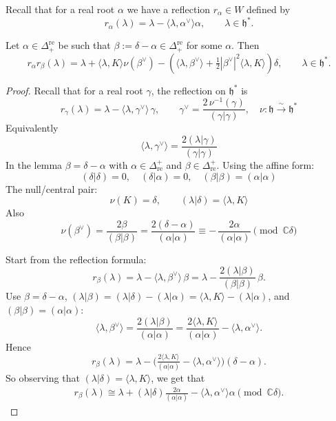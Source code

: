 \documentclass[12pt]{article}
\begin{document}
Recall that for a real root $\alpha$ we have a reflection $r_\alpha \in W$ defined by
\[
r_\alpha(\lambda) = \lambda - \langle \lambda, \alpha^\vee \rangle \alpha,
\qquad \lambda \in \mathfrak{h}^*.
\]

\begin{lemma}[6.5]
Let $\alpha \in \Delta^{\mathrm{re}}_+$ be such that $\beta := \delta - \alpha\in \Delta^{\mathrm{re}}_+$ 
for some $\alpha$. Then
\[
r_\alpha r_\beta(\lambda) 
= \lambda + \langle \lambda, K \rangle \nu(\beta^\vee) - (\langle \lambda, \beta^\vee\rangle 
+ \tfrac{1}{2}|\beta^\vee|^2 \langle \lambda, K \rangle)\delta,
\qquad \lambda \in \mathfrak{h}^*.
\]
\end{lemma}

\begin{proof}
    Recall that for a real root $\gamma$, the reflection on $\mathfrak{h}^*$ is
    \[
    r_\gamma(\lambda)=\lambda-\langle\lambda,\gamma^\vee\rangle\,\gamma,
    \qquad
    \gamma^\vee=\frac{2\,\nu^{-1}(\gamma)}{(\gamma|\gamma)},\quad
    \nu:\mathfrak{h}\overset{\sim}{\to}\mathfrak{h}^*
    \]
    Equivalently
    \[
    \langle\lambda,\gamma^\vee\rangle=\frac{2(\lambda|\gamma)}{(\gamma|\gamma)}
    \]
    In the lemma $\beta=\delta-\alpha$ with $\alpha\in\Delta_{\mathrm{re}}^+$ and $\beta\in\Delta_{\mathrm{re}}^+$.
    Using the affine form:
    \[
    (\delta|\delta)=0,\quad (\delta|\alpha)=0,\quad (\beta|\beta)=(\alpha|\alpha)
    \]
    The null/central pair:
    \[
    \nu(K)=\delta,\qquad (\lambda|\delta)=\langle\lambda,K\rangle
    \]
    Also
    \[
    \nu(\beta^\vee)=\frac{2\beta}{(\beta|\beta)}=\frac{2(\delta-\alpha)}{(\alpha|\alpha)}
    \equiv -\,\frac{2\alpha}{(\alpha|\alpha)} \pmod{\mathbb{C}\delta}
    \]

    Start from the reflection formula:
    \[
    r_\beta(\lambda)=\lambda-\langle\lambda,\beta^\vee\rangle\,\beta
    =\lambda-\frac{2(\lambda|\beta)}{(\beta|\beta)}\,\beta.
    \]
    Use $\beta=\delta-\alpha$, $(\lambda|\beta)=(\lambda|\delta)-(\lambda|\alpha)=\langle\lambda,K\rangle-(\lambda|\alpha)$, and $(\beta|\beta)=(\alpha|\alpha)$:
    \[
    \langle\lambda,\beta^\vee\rangle
    = \frac{2(\lambda|\beta)}{(\alpha|\alpha)}
    = \frac{2\langle\lambda,K\rangle}{(\alpha|\alpha)}-\langle\lambda,\alpha^\vee\rangle .
    \]
    Hence
    \[
    r_\beta(\lambda)
    = \lambda -\Big(\tfrac{2\langle\lambda,K\rangle}{(\alpha|\alpha)}-\langle\lambda,\alpha^\vee\rangle\Big)(\delta-\alpha).
    \]
    So observing that $(\lambda|\delta) = \langle\lambda,K\rangle$, we get that \begin{align}
    r_\beta(\lambda) \cong \lambda + (\lambda|\delta)\frac{2\alpha}{(\alpha|\alpha)} - \langle\lambda,\alpha^\vee\rangle\alpha \pmod{\mathbb{C}\delta}.
    \end{align}


\end{proof}
\end{document}
